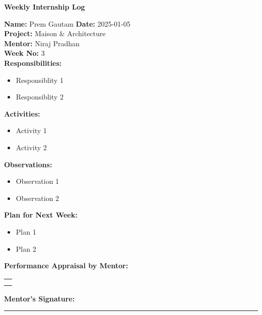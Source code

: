 \begin{center}
    \bfseries Weekly Internship Log
  \end{center}
  
  \noindent
  \textbf{Name:} Prem Gautam \hfill \textbf{Date:} 2025-01-05 \\
  \textbf{Project:} Maison & Architecture \hfill \\
  \textbf{Mentor:} Niraj Pradhan \\
  \textbf{Week No:} 3 \\
  
  \noindent
  \textbf{Responsibilities:}
  \begin{itemize}
      \item Responsiblity 1
      \item Responsiblity 2
  \end{itemize}
  
  \noindent
  \textbf{Activities:}
  \begin{itemize}
      \item Activity 1
      \item Activity 2
  \end{itemize}
  
  \noindent
  \textbf{Observations:}
  \begin{itemize}
      \item Observation 1
      \item Observation 2
  \end{itemize}
  
  \noindent
  \textbf{Plan for Next Week:}
  \begin{itemize}
      \item  Plan 1
      \item Plan 2
  \end{itemize}
  
  \noindent
  \textbf{Performance Appraisal by Mentor:} \\
  \begin{table}[h]
      \centering
      \noindent
      \begin{tabularx}{\textwidth} { 
          | >{\centering\arraybackslash}X| }
  
          \hline
            \\ \\       	                    
          \hline
      \end{tabularx}
  \end{table}
  
  
  \vspace{2em}
  \noindent
  \textbf{Mentor’s Signature:} \\
  \rule{0.4\textwidth}{0.5pt}